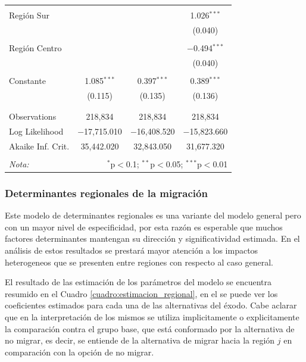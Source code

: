 \documentclass[12pt,a4paper]{article}
\begin{document}
\begin{table}[!htbp]
\begin{tabular}{@{\extracolsep{5pt}}lccc}
  & & & \\ 
 Región Sur &  &  & 1.026$^{***}$ \\ 
  &  &  & (0.040) \\ 
  & & & \\ 
 Región Centro &  &  & $-$0.494$^{***}$ \\ 
  &  &  & (0.040) \\ 
  & & & \\ 
 Constante & 1.085$^{***}$ & 0.397$^{***}$ & 0.389$^{***}$ \\ 
  & (0.115) & (0.135) & (0.136) \\ 
  & & & \\ 
\hline \\[-1.8ex] 
Observations & 218,834 & 218,834 & 218,834 \\ 
Log Likelihood & $-$17,715.010 & $-$16,408.520 & $-$15,823.660 \\ 
Akaike Inf. Crit. & 35,442.020 & 32,843.050 & 31,677.320 \\ 
\hline 
\hline \\[-1.8ex] 
\textit{Nota:}  & \multicolumn{3}{r}{$^{*}$p$<$0.1; $^{**}$p$<$0.05; $^{***}$p$<$0.01} \\ 
\end{tabular} 
\end{table} 



\subsubsection{Determinantes regionales de la migración}
Este modelo de determinantes regionales es una variante del modelo general pero con un mayor nivel de especificidad, por esta razón es esperable que muchos factores determinantes mantengan su dirección y significatividad estimada. En el análisis de estos resultados se prestará mayor atención a los impactos heterogeneos que se presenten entre regiones con respecto al caso general.

El resultado de las estimación de los parámetros del modelo se encuentra resumido en el Cuadro \ref{cuadro:estimacion_regional}, en el se puede ver los coeficientes estimados para cada una de las alternativas del éxodo. Cabe aclarar que en la interpretación de los mismos se utiliza implicitamente o explicitamente la comparación contra el grupo base, que está conformado por la alternativa de no migrar, es decir, se entiende de la alternativa de migrar hacia la región $j$ en comparación con la opción de no migrar.
\end{document}
